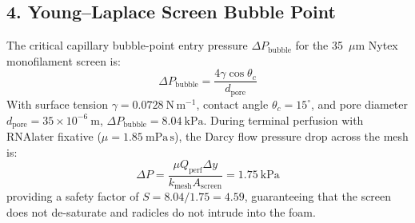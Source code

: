 \documentclass[10pt,a4paper]{article}
\begin{document}
\subsection*{4. Young--Laplace Screen Bubble Point}
The critical capillary bubble-point entry pressure $\Delta P_{\mathrm{bubble}}$ for the 35~$\mu$m Nytex monofilament screen is:
\begin{equation}
\Delta P_{\mathrm{bubble}} = \frac{4 \gamma \cos \theta_c}{d_{\mathrm{pore}}}
\end{equation}
With surface tension $\gamma = 0.0728\ \mathrm{N\,m^{-1}}$, contact angle $\theta_c = 15^\circ$, and pore diameter $d_{\mathrm{pore}} = 35 \times 10^{-6}\ \mathrm{m}$, $\Delta P_{\mathrm{bubble}} = 8.04\ \mathrm{kPa}$. During terminal perfusion with RNAlater fixative ($\mu = 1.85\ \mathrm{mPa\,s}$), the Darcy flow pressure drop across the mesh is:
\begin{equation}
\Delta P = \frac{\mu Q_{\mathrm{perf}} \Delta y}{k_{\mathrm{mesh}} A_{\mathrm{screen}}} = 1.75\ \mathrm{kPa}
\end{equation}
providing a safety factor of $S = 8.04 / 1.75 = 4.59$, guaranteeing that the screen does not de-saturate and radicles do not intrude into the foam.
\end{document}
